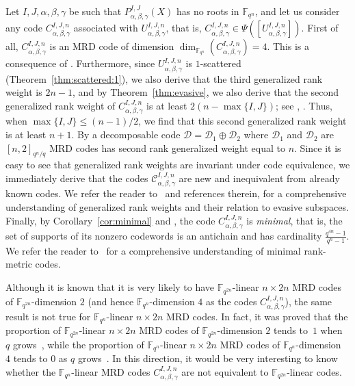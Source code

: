 \begin{rema}\label{rem:genweights} 
Let $I,J,\alpha,\beta,\gamma$ be such that  $P^{I,J}_{\alpha,\beta,\gamma}(X)$ has no roots in $\mathbb{F}_{q^n}$, and let us consider any code $C_{\alpha, \beta, \gamma}^{I,J,n}$ associated with $U_{\alpha, \beta, \gamma}^{I,J,n}$, that is, $C_{\alpha, \beta, \gamma}^{I,J,n}\in\Psi([U_{\alpha, \beta, \gamma}^{I,J,n}])$. First of all, $C_{\alpha, \beta, \gamma}^{I,J,n}$ is an MRD code of dimension $\dim_{{\mathbb F}_{q^n}}(C_{\alpha, \beta, \gamma}^{I,J,n})=4$. This is a consequence of \cite[Theorem 3.2]{csajbok2017maximum}. 
Furthermore, since $U_{\alpha, \beta, \gamma}^{I,J,n}$ is $1$-scattered (Theorem~\ref{thm:scattered:1}), we also derive that the third generalized rank weight is $2n-1$, and by Theorem~\ref{thm:evasive}, we also derive that the second generalized rank weight of $C_{\alpha, \beta, \gamma}^{I,J,n}$ is at least
$2(n-\max\{I,J\})$; see \cite[Theorem 3]{randrianarisoa2020geometric}, \cite[Theorem 3.3]{marino2022evasive}. Thus, when $\max\{I,J\}\leq (n-1)/2$, we find that this second generalized rank weight is at least $n+1$.  By \cite[Proposition 4.10]{BMN2022} a decomposable code $\mathcal{D}=\mathcal{D}_1\oplus \mathcal{D}_2$ where $\mathcal{D}_1$  and $\mathcal{D}_2$ are $[n,2]_{q^n/q}$ MRD codes has second rank generalized weight equal to $n$. Since it is easy to see that generalized rank weights are invariant under code equivalence, we immediately derive that the codes $\mathcal{C}_{\alpha, \beta, \gamma}^{I,J,n}$ are new and inequivalent from already known codes. { We refer the reader to~\cite{marino2022evasive} and references therein, for a comprehensive understanding of generalized rank weights and their relation to evasive subspaces.}
Finally, by Corollary~\ref{cor:minimal} and \cite[Corollary 5.7]{ABNR22}, the code $C_{\alpha, \beta, \gamma}^{I,J,n}$ is \emph{minimal}, that is, the set of supports of its nonzero codewords is an antichain and has cardinality $\frac{q^{4n}-1}{q^n-1}$. We refer the reader to~\cite{ABNR22} for a comprehensive understanding of minimal rank-metric codes.
\end{rema}

\begin{rema}
    {
    Although it is known that it is very likely to have $\mathbb F_{q^{2n}}$-linear $n \times 2n$ MRD codes of $\mathbb F_{q^{2n}}$-dimension $2$ (and hence $\mathbb F_{q^{n}}$-dimension $4$ as the codes $C^{I,J,n}_{\alpha,\beta,\gamma}$), the same result is not true for $\mathbb F_{q^n}$-linear $n \times 2n$ MRD codes. In fact, it was proved that the proportion of $\mathbb F_{q^{2n}}$-linear $n \times 2n$  MRD codes of $\mathbb F_{q^{2n}}$-dimension $2$ tends to~$1$ when~$q$ grows~\cite{neri2018genericity}, while the proportion of $\mathbb F_{q^n}$-linear $n \times 2n$ MRD codes of $\mathbb F_{q^{n}}$-dimension~$4$ tends to $0$ as $q$ grows~\cite{gruica2024densities}. 
    In this direction, it would be very interesting to know whether the $\mathbb F_{q^n}$-linear MRD  codes $C^{I,J,n}_{\alpha,\beta,\gamma}$ are not equivalent to  $\mathbb F_{q^{2n}}$-linear codes.    }
\end{rema}

